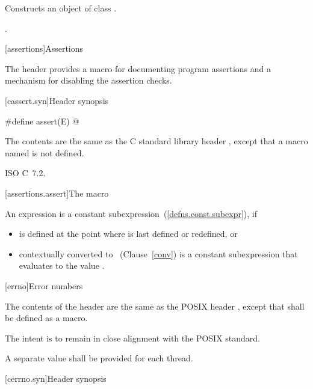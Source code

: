 \begin{itemdescr}
\pnum
\effects
Constructs an object of class
.

\pnum
\postcondition
{}.
\end{itemdescr}

[assertions]{Assertions}

\pnum
The header
provides a macro for documenting \Cpp program assertions and a mechanism
for disabling the assertion checks.

[cassert.syn]{Header  synopsis}

%
%
\begin{codeblock}
#define assert(E) @\seebelow@
\end{codeblock}

\pnum
{}%
%
The contents are the same as the C standard library header
,
except that a macro named 
is not defined.

\xref ISO C~7.2.

[assertions.assert]{The  macro}

\pnum
An expression 
is a constant subexpression~(\ref{defns.const.subexpr}), if
\begin{itemize}
\item
{} is defined at the point where 
is last defined or redefined, or
\item
{} contextually converted to ~(Clause~\ref{conv})
is a constant subexpression that evaluates to the value .
\end{itemize}

[errno]{Error numbers}

\pnum
{}%
The contents of the header  are the same as the POSIX header
, except that  shall be defined as a macro.
\begin{note}
The intent is to remain in close alignment with the POSIX standard.
\end{note}
A separate  value shall be provided for each thread.

[cerrno.syn]{Header  synopsis}

